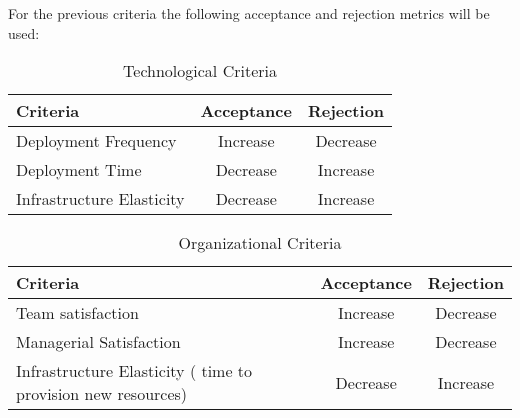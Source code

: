 	For the previous criteria the following acceptance and rejection metrics will be used: 
    
		\begin{table}[h!]
			\centering
            \caption{Technological Criteria}
			\label{tab1}
			\begin{tabular}{|l|c|c|}
               	\hline
 				Criteria & Acceptance & Rejection  \\ \hline
 				Deployment Frequency & Increase  & Decrease   \\ \hline
 				Deployment Time & Decrease &  Increase  \\ \hline
 				Infrastructure Elasticity & Decrease & Increase \\ \hline 
			\end{tabular}
		\end{table}



		\begin{table}[h!]
			\centering
            \caption{Organizational Criteria}
			\label{tab2}
				\begin{tabular}{|l|c|c|}
                	\hline
 					Criteria & Acceptance & Rejection  \\ \hline
 					Team satisfaction & Increase  & Decrease   \\ \hline
 					Managerial Satisfaction & Increase &  Decrease  \\ \hline
 					Infrastructure Elasticity ( time to provision new resources) & Decrease & Increase \\ \hline 
				\end{tabular}
			\end{table}

	